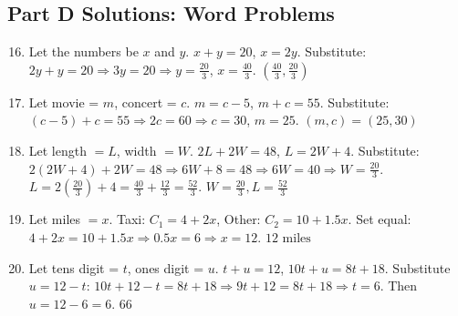 \documentclass[14pt]{extarticle}
\begin{document}
\subsection*{Part D Solutions: Word Problems}
\begin{enumerate}
    \setcounter{enumi}{15}
    \item Let the numbers be \(x\) and \(y\).  
    \(x + y = 20\), \(x = 2y\).  
    Substitute: \(2y + y = 20 \Rightarrow 3y = 20 \Rightarrow y = \tfrac{20}{3}\), \(x = \tfrac{40}{3}\).  
    \(\boxed{(\tfrac{40}{3}, \tfrac{20}{3})}\)

    \item Let movie = \(m\), concert = \(c\).  
    \(m = c - 5\), \(m + c = 55\).  
    Substitute: \((c - 5) + c = 55 \Rightarrow 2c = 60 \Rightarrow c = 30\), \(m = 25\).  
    \(\boxed{(m, c) = (25, 30)}\)

    \item Let length \(= L\), width \(= W\).  
    \(2L + 2W = 48\), \(L = 2W + 4\).  
    Substitute: \(2(2W + 4) + 2W = 48 \Rightarrow 6W + 8 = 48 \Rightarrow 6W = 40 \Rightarrow W = \tfrac{20}{3}\).
    \(L = 2(\tfrac{20}{3}) + 4 = \tfrac{40}{3} + \tfrac{12}{3} = \tfrac{52}{3}\).
    \(\boxed{W = \tfrac{20}{3}, L = \tfrac{52}{3}}\)

    \item Let miles \(= x\).  
    Taxi: \(C_1 = 4 + 2x\), Other: \(C_2 = 10 + 1.5x\).  
    Set equal: \(4 + 2x = 10 + 1.5x \Rightarrow 0.5x = 6 \Rightarrow x = 12\).  
    \(\boxed{12\text{ miles}}\)

    \item Let tens digit = \(t\), ones digit = \(u\).
    \(t + u = 12\), \(10t + u = 8t + 18\).
    Substitute \(u = 12 - t\): \(10t + 12 - t = 8t + 18 \Rightarrow 9t + 12 = 8t + 18 \Rightarrow t = 6\).
    Then \(u = 12 - 6 = 6\).
    \(\boxed{66}\)
\end{enumerate}




\end{document}
